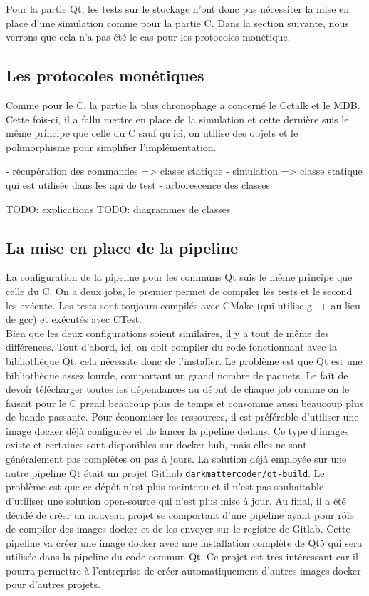 \documentclass[a4paper]{article}
\begin{document}
Pour la partie Qt, les tests sur le stockage n'ont donc pas nécessiter la mise
en place d'une simulation comme pour la partie C. Dans la section suivante, nous
verrons que cela n'a pas été le cas pour les protocoles monétique.

\subsection{Les protocoles monétiques}

Comme pour le C, la partie la plus chronophage a concerné le Cctalk et le MDB.
Cette fois-ci, il a fallu mettre en place de la simulation et cette dernière
suis le même principe que celle du C sauf qu'ici, on utilise des objets et le
polimorphisme pour simplifier l'implémentation.

- récupération des commandes => classe statique
- simulation => classe statique qui est utilisée dans les api de test
- arborescence des classes

TODO: explications
TODO: diagrammes de classes

\subsection{La mise en place de la pipeline}

La configuration de la pipeline pour les communs Qt suis le même principe que
celle du C. On a deux jobs, le premier permet de compiler les tests et le second
les exécute. Les tests sont toujours compilés avec CMake (qui utilise g++ au
lieu de gcc) et exécutés avec CTest.\\

Bien que les deux configurations soient similaires, il y a tout de même des
différences. Tout d'abord, ici, on doit compiler du code fonctionnant avec la
bibliothèque Qt, cela nécessite donc de l'installer. Le problème est que Qt est
une bibliothèque assez lourde, comportant un grand nombre de paquets. Le fait de
devoir télécharger toutes les dépendances au début de chaque job comme on le
faisait pour le C prend beaucoup plus de temps et consomme aussi beaucoup plus
de bande passante. Pour économiser les ressources, il est préférable d'utiliser
une image docker déjà configurée et de lancer la pipeline dedans. Ce type
d'images existe et certaines sont disponibles sur docker hub, mais elles ne sont
généralement pas complètes ou pas à jours. La solution déjà employée sur une
autre pipeline Qt était un projet Github \verb|darkmattercoder/qt-build|. Le
problème est que ce dépôt n'est plus maintenu et il n'est pas souhaitable
d'utiliser une solution open-source qui n'est plus mise à jour. Au final, il a
été décidé de créer un nouveau projet se comportant d'une pipeline ayant pour
rôle de compiler des images docker et de les envoyer sur le registre de Gitlab.
Cette pipeline va créer une image docker avec une installation complète de Qt5
qui sera utilisée dans la pipeline du code commun Qt. Ce projet est très
intéressant car il pourra permettre à l'entreprise de créer automatiquement
d'autres images docker pour d'autres projets.
\end{document}

